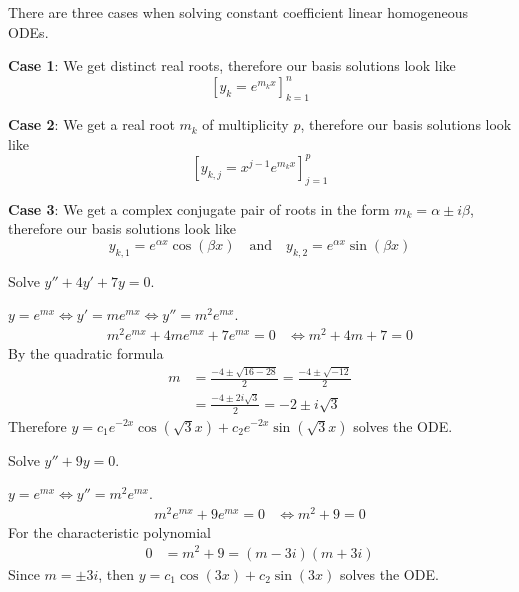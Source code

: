 \documentclass[notes]{subfiles}
\begin{document}
There are three cases when solving constant coefficient linear homogeneous ODEs.

\textbf{Case 1}: We get distinct real roots, therefore our basis solutions look like
\[
    [y_k = e^{m_k x}]_{k = 1}^n
\]

\textbf{Case 2}: We get a real root $m_k$ of multiplicity $p$, therefore our basis solutions look like
\[
    [y_{k, j} = x^{j - 1}e^{m_k x}]_{j = 1}^p
\]

\textbf{Case 3}: We get a complex conjugate pair of roots in the form $m_k = \alpha \pm i\beta$, therefore our basis solutions look like
\[
    y_{k, 1} = e^{\alpha x}\cos(\beta x) \quad \text{and} \quad y_{k, 2} = e^{\alpha x}\sin(\beta x)
\]

\begin{exercise}
    Solve $y'' + 4y' + 7y = 0$.
\end{exercise}
\begin{solution}
    $y = e^{mx} \iff y' = me^{mx} \iff y'' = m^2e^{mx}$.
    \begin{align*}
        m^2e^{mx} + 4me^{mx} + 7e^{mx} = 0
        &\iff m^2 + 4m + 7 = 0
    \end{align*}
    By the quadratic formula
    \begin{align*}
        m
        &= \frac{-4 \pm \sqrt{16 - 28}}{2}
        = \frac{-4 \pm \sqrt{-12}}{2} \\
        &= \frac{-4 \pm 2i\sqrt{3}}{2}
        = -2 \pm i\sqrt{3}
    \end{align*}
    Therefore $y = c_1 e^{-2x}\cos(\sqrt{3}x) + c_2 e^{-2x}\sin(\sqrt{3}x)$ solves the ODE.
\end{solution}

\begin{exercise}
    Solve $y'' + 9y = 0$.
\end{exercise}
\begin{solution}
    $y = e^{mx} \iff y'' = m^2e^{mx}$.
    \begin{align*}
        m^2e^{mx} + 9e^{mx} = 0
        &\iff m^2 + 9 = 0
    \end{align*}
    For the characteristic polynomial
    \begin{align*}
        0
        &= m^2 + 9
        = (m - 3i)(m + 3i)
    \end{align*}
    Since $m = \pm 3i$, then $y = c_1 \cos(3x) + c_2 \sin(3x)$ solves the ODE.
\end{solution}
\end{document}

